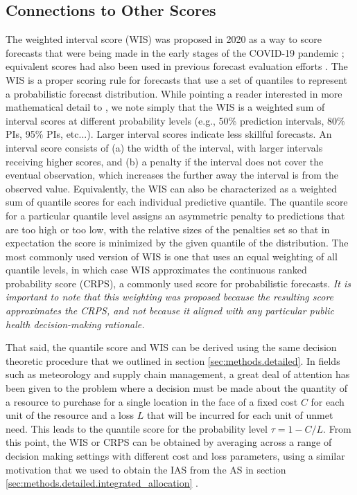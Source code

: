 \documentclass{article}\usepackage[]{graphicx}\usepackage[]{xcolor}
\begin{document}
\subsection{Connections to Other Scores}
\label{sec:methods.related}

The weighted interval score (WIS) was proposed in 2020 as a way to score forecasts that were being made in the early stages of the COVID-19 pandemic \citep{bracher2021evaluating}; equivalent scores had also been used in previous forecast evaluation efforts \cite[e.g.,][]{hong2016probabilisticEnergyForecasting}.
The WIS is a proper scoring rule for forecasts that use a set of quantiles to represent a probabilistic forecast distribution.
While pointing a reader interested in more mathematical detail to \cite{bracher2021evaluating}, we note simply that the WIS is a weighted sum of interval scores at different probability levels (e.g., 50\% prediction intervals, 80\% PIs, 95\% PIs, etc...).
Larger interval scores indicate less skillful forecasts.
An interval score consists of (a) the width of the interval, with larger intervals receiving higher scores, and (b) a penalty if the interval does not cover the eventual observation, which increases the further away the interval is from the observed value.
Equivalently, the WIS can also be characterized as a weighted sum of quantile scores for each individual predictive quantile.
The quantile score for a particular quantile level assigns an asymmetric penalty to predictions that are too high or too low, with the relative sizes of the penalties set so that in expectation the score is minimized by the given quantile of the distribution.
The most commonly used version of WIS is one that uses an equal weighting of all quantile levels, in which case WIS approximates the continuous ranked probability score (CRPS), a commonly used score for probabilistic forecasts.
\emph{It is important to note that this weighting was proposed because the resulting score approximates the CRPS, and not because it aligned with any particular public health decision-making rationale.}

That said, the quantile score and WIS can be derived using the same decision theoretic procedure that we outlined in section \ref{sec:methods.detailed}.
In fields such as meteorology and supply chain management, a great deal of attention has been given to the problem where a decision must be made about the quantity of a resource to purchase for a single location in the face of a fixed cost $C$ for each unit of the resource and a loss $L$ that will be incurred for each unit of unmet need.
This leads to the quantile score for the probability level $\tau = 1 - C/L$.
From this point, the WIS or CRPS can be obtained by averaging across a range of decision making settings with different cost and loss parameters, using a similar motivation that we used to obtain the IAS from the AS in section \ref{sec:methods.detailed.integrated_allocation} \citep{gneiting2011weightedScoringRules}.
\end{document}
